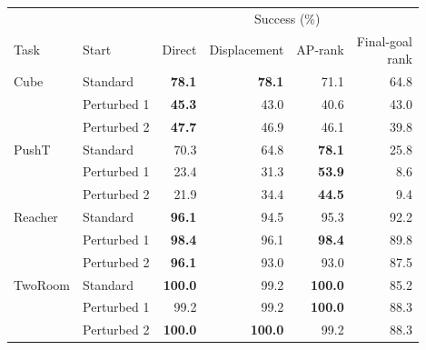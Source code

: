 \begingroup
\normalsize
\setlength{\tabcolsep}{5pt}
\begin{tabular}{@{}llrrrr@{}}
\toprule
 & & \multicolumn{4}{c}{Success (\%)} \\
\cmidrule(l){3-6}
Task & Start & Direct & Displacement & AP-rank & \shortstack{Final-goal\\rank} \\
\midrule
Cube & Standard & \textbf{78.1} & \textbf{78.1} & 71.1 & 64.8 \\
 & Perturbed 1 & \textbf{45.3} & 43.0 & 40.6 & 43.0 \\
 & Perturbed 2 & \textbf{47.7} & 46.9 & 46.1 & 39.8 \\
\midrule
PushT & Standard & 70.3 & 64.8 & \textbf{78.1} & 25.8 \\
 & Perturbed 1 & 23.4 & 31.3 & \textbf{53.9} & 8.6 \\
 & Perturbed 2 & 21.9 & 34.4 & \textbf{44.5} & 9.4 \\
\midrule
Reacher & Standard & \textbf{96.1} & 94.5 & 95.3 & 92.2 \\
 & Perturbed 1 & \textbf{98.4} & 96.1 & \textbf{98.4} & 89.8 \\
 & Perturbed 2 & \textbf{96.1} & 93.0 & 93.0 & 87.5 \\
\midrule
TwoRoom & Standard & \textbf{100.0} & 99.2 & \textbf{100.0} & 85.2 \\
 & Perturbed 1 & 99.2 & 99.2 & \textbf{100.0} & 88.3 \\
 & Perturbed 2 & \textbf{100.0} & \textbf{100.0} & 99.2 & 88.3 \\
\bottomrule
\end{tabular}
\endgroup
